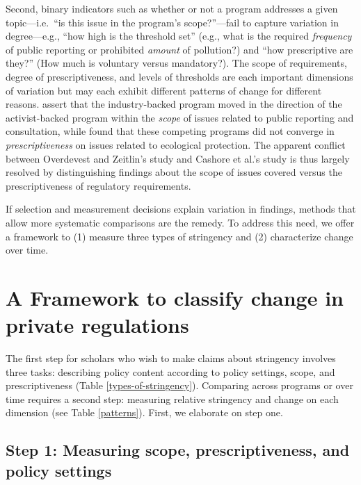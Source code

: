 \documentclass[
      12pt,
            Review ]{article}
\begin{document}
Second, binary indicators such as whether or not a program addresses a given topic---i.e.~``is this issue in the program's scope?''---fail to capture variation in degree---e.g., ``how high is the threshold set'' (e.g., what is the required \emph{frequency} of public reporting or prohibited \emph{amount} of pollution?) and ``how prescriptive are they?'' (How much is voluntary versus mandatory?). The scope of requirements, degree of prescriptiveness, and levels of thresholds are each important dimensions of variation but may each exhibit different patterns of change for different reasons. \citet{Overdevest2014} assert that the industry-backed program moved in the direction of the activist-backed program within the \emph{scope} of issues related to public reporting and consultation, while \citet{Cashore2004} found that these competing programs did not converge in \emph{prescriptiveness} on issues related to ecological protection. The apparent conflict between Overdevest and Zeitlin's study and Cashore et al.'s study is thus largely resolved by distinguishing findings about the scope of issues covered versus the prescriptiveness of regulatory requirements.

If selection and measurement decisions explain variation in findings, methods that allow more systematic comparisons are the remedy. To address this need, we offer a framework to (1) measure three types of stringency and (2) characterize change over time.

\hypertarget{a-framework-to-classify-change-in-private-regulations}{%
\section{A Framework to classify change in private regulations}\label{a-framework-to-classify-change-in-private-regulations}}

The first step for scholars who wish to make claims about stringency involves three tasks: describing policy content according to policy settings, scope, and prescriptiveness (Table \ref{types-of-stringency}). Comparing across programs or over time requires a second step: measuring relative stringency and change on each dimension (see Table \ref{patterns}). First, we elaborate on step one.

\hypertarget{step-1-measuring-scope-prescriptiveness-and-policy-settings}{%
\subsection{Step 1: Measuring scope, prescriptiveness, and policy settings}\label{step-1-measuring-scope-prescriptiveness-and-policy-settings}}
\end{document}
